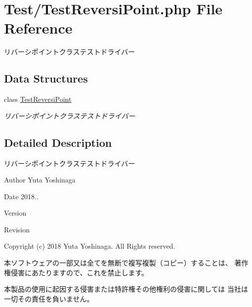 \hypertarget{_test_reversi_point_8php}{}\section{Test/\+Test\+Reversi\+Point.php File Reference}
\label{_test_reversi_point_8php}


リバーシポイントクラステストドライバー  


\subsection*{Data Structures}
\begin{DoxyCompactItemize}
\item 
class \hyperlink{class_test_reversi_point}{Test\+Reversi\+Point}
\begin{DoxyCompactList}\small\item\em リバーシポイントクラステストドライバー \end{DoxyCompactList}\end{DoxyCompactItemize}


\subsection{Detailed Description}
リバーシポイントクラステストドライバー 

\begin{DoxyAuthor}{Author}
Yuta Yoshinaga 
\end{DoxyAuthor}
\begin{DoxyDate}{Date}
2018.. 
\end{DoxyDate}
\begin{DoxyParagraph}{Version}

\end{DoxyParagraph}
\begin{DoxyParagraph}{Revision}

\end{DoxyParagraph}


Copyright (c) 2018 Yuta Yoshinaga. All Rights reserved.


\begin{DoxyItemize}
\item 本ソフトウェアの一部又は全てを無断で複写複製（コピー）することは、 著作権侵害にあたりますので、これを禁止します。
\item 本製品の使用に起因する侵害または特許権その他権利の侵害に関しては 当社は一切その責任を負いません。 
\end{DoxyItemize}